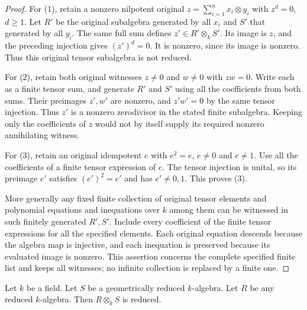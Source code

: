 \begin{proof}
For (1), retain a nonzero nilpotent original
$z=\sum_{i=1}^n x_i\otimes y_i$ with
$z^d=0$, $d\geq1$. Let $R'$ be the
original subalgebra generated by all $x_i$
and $S'$ that generated by all $y_i$.
The same full sum defines $z'\in R'\otimes_kS'$.
Its image is $z$, and the preceding
injection gives $(z')^d=0$. It is nonzero,
since its image is nonzero. Thus this
original tensor subalgebra is not reduced.

For (2), retain both original witnesses
$z\ne0$ and $w\ne0$ with $zw=0$.
Write each as a finite tensor sum, and
generate $R'$ and $S'$ using all the
coefficients from both sums. Their
preimages $z',w'$ are nonzero, and
$z'w'=0$ by the same tensor injection.
Thus $z'$ is a nonzero zerodivisor
in the stated finite subalgebra.
Keeping only the coefficients of $z$
would not by itself supply its required
nonzero annihilating witness.

For (3), retain an original idempotent
$e$ with $e^2=e$, $e\ne0$ and $e\ne1$.
Use all the coefficients of a finite
tensor expression of $e$. The tensor
injection is unital, so its preimage
$e'$ satisfies $(e')^2=e'$ and has
$e'\ne0,1$. This proves (3).

More generally any fixed finite collection
of original tensor elements and polynomial
equations and inequations over $k$ among
them can be witnessed in such finitely
generated $R',S'$. Include every coefficient
of the finite tensor expressions for all
the specified elements. Each original
equation descends because the algebra
map is injective, and each inequation
is preserved because its evaluated image
is nonzero. This assertion concerns the
complete specified finite list and keeps
all witnesses; no infinite collection
is replaced by a finite one.
\end{proof}

\begin{lemma}
\label{editorial-source-lemma-geometrically-reduced-any-reduced-base-change}
Let $k$ be a field.
Let $S$ be a geometrically reduced $k$-algebra.
Let $R$ be any reduced $k$-algebra.
Then $R \otimes_k S$ is reduced.
\end{lemma}

